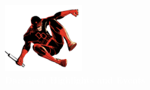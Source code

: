 \documentclass[12pt]{article}
\begin{document}
\newpage
\hypertarget{daredevil}{}

\begin{center}
  \vspace*{2cm}
  \includegraphics[width=0.25\textwidth]{daredevil1.png}\\[0.5cm]
  {\Huge\bfseries\textcolor{white}{Daredevil Highlights and Events}}\\[1cm]
\end{center}

\vspace{0.5cm}
\end{document}
